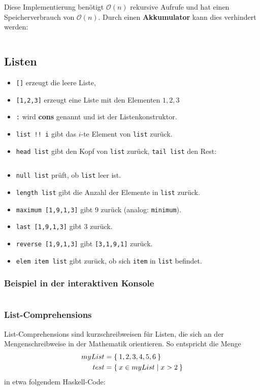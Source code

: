 Diese Implementierung benötigt $\mathcal{O}(n)$ rekursive Aufrufe und
hat einen Speicherverbrauch von $\mathcal{O}(n)$. Durch einen
\textbf{Akkumulator} kann dies verhindert werden:
\inputminted[numbersep=5pt, tabsize=4]{haskell}{scripts/haskell/fakultaet-akkumulator.hs}

\subsection{Listen}
\begin{itemize}
    \item \texttt{[]} erzeugt die leere Liste,
    \item \texttt{[1,2,3]} erzeugt eine Liste mit den Elementen $1, 2, 3$
    \item \texttt{:} wird \textbf{cons} genannt und ist
          der Listenkonstruktor.
    \item \texttt{list !! i} gibt das $i$-te Element von \texttt{list} zurück.
    \item \texttt{head list} gibt den Kopf von \texttt{list} zurück,
          \texttt{tail list} den Rest:
          \inputminted[numbersep=5pt, tabsize=4]{haskell}{scripts/haskell/list-basic.sh}
    \item \texttt{null list} prüft, ob \texttt{list} leer ist.
    \item \texttt{length list} gibt die Anzahl der Elemente in \texttt{list} zurück.
    \item \texttt{maximum [1,9,1,3]} gibt 9 zurück (analog: \texttt{minimum}).
    \item \texttt{last [1,9,1,3]} gibt 3 zurück.
    \item \texttt{reverse [1,9,1,3]} gibt \texttt{[3,1,9,1]} zurück.
    \item \texttt{elem item list} gibt zurück, ob sich \texttt{item} in \texttt{list} befindet.
\end{itemize}

\subsubsection{Beispiel in der interaktiven Konsole}
\inputminted[numbersep=5pt, tabsize=4]{haskell}{scripts/haskell/listenoperationen.sh}

\subsubsection{List-Comprehensions}
List-Comprehensions sind kurzschreibweisen für Listen, die sich an 
der Mengenschreibweise in der Mathematik orientieren. So entspricht
die Menge
\begin{align*}
    myList &= \Set{1,2,3,4,5,6}\\
    test   &= \Set{x \in myList | x > 2}
\end{align*}
in etwa folgendem Haskell-Code:
\inputminted[numbersep=5pt, tabsize=4]{haskell}{scripts/haskell/list-comprehensions.sh}

